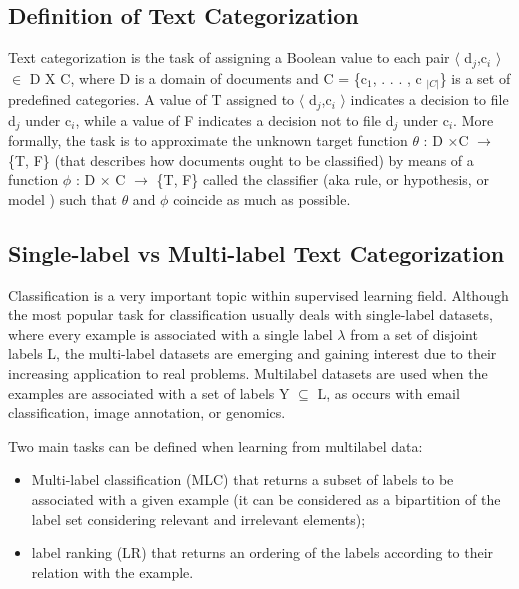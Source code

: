 \subsection{Definition of Text Categorization}
Text categorization is the task of assigning a Boolean value to each pair $\langle$ d$_{j}$,c$_{i}$ $\rangle$ $\in$ D X C,  where D is a domain of documents and C = \{c$_{1}$, . . . , c $_{|C|}$\} is a set of predefined categories. A value of T assigned to $\langle$ d$_{j}$,c$_{i}$ $\rangle$ indicates a decision to file d$_{j}$ under c$_{i}$, while a value of F indicates a decision not to file d$_{j}$ under c$_{i}$. More formally, the task is to approximate the unknown target function $\theta$ : D ×C $\rightarrow$ \{T, F\} (that describes how documents ought to be classified) by means of a function $\phi$ : D × C $\rightarrow$ \{T, F\} called the classifier (aka rule, or hypothesis, or model ) such that $\theta$ and $\phi$ coincide as much as possible.\cite{Sebastiani2002}

\subsection{Single-label vs Multi-label Text Categorization}
Classification is a very important topic within supervised learning field. Although the most popular task for classification usually deals with single-label datasets, where every example
is associated with a single label $\lambda$ from a set of disjoint labels L, the multi-label datasets are emerging and gaining interest due to their increasing application to real problems. Multilabel datasets are used when the examples are associated with a set of labels Y $\subseteq$ L, as occurs with email classification, image annotation, or genomics.

Two main tasks can be defined when learning from multilabel
data: 
\begin{itemize}
\item Multi-label classification (MLC) that returns a subset of labels to be associated with a given example (it can be considered as a bipartition of the label set considering relevant and irrelevant elements);
\item label ranking (LR) that returns an ordering of the labels according to their relation with the example. \cite{Carmona2011}
\end{itemize}

